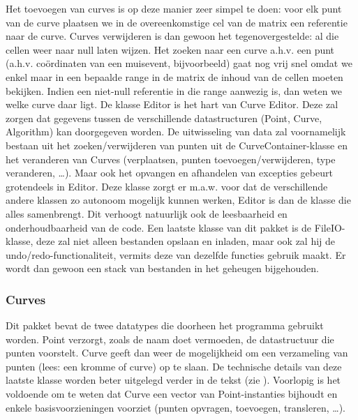 \documentclass[a4paper,11pt,oneside, titlepage]{article}
\begin{document}
Het toevoegen van curves is op deze manier zeer simpel te doen: voor elk punt van de curve plaatsen we in de overeenkomstige cel van de matrix een referentie naar de curve.
Curves verwijderen is dan gewoon het tegenovergestelde: al die cellen weer naar null laten wijzen. Het zoeken naar een curve a.h.v. een punt (a.h.v. co\"ordinaten van een muisevent, bijvoorbeeld) 
gaat nog vrij snel omdat we enkel maar in een bepaalde range in de matrix de inhoud van de cellen moeten bekijken. Indien een niet-null referentie in die range aanwezig is, dan weten we welke curve
daar ligt.\newline \newline
De klasse Editor is het hart van Curve Editor. Deze zal zorgen dat gegevens tussen de verschillende datastructuren (Point, Curve, Algorithm) kan doorgegeven worden.
De uitwisseling van data zal voornamelijk bestaan uit het zoeken/verwijderen van punten uit de CurveContainer-klasse en het veranderen van Curves (verplaatsen, punten toevoegen/verwijderen, type veranderen, \ldots).
Maar ook het opvangen en afhandelen van excepties gebeurt grotendeels in Editor. Deze klasse zorgt er m.a.w. voor dat de 
verschillende andere klassen zo autonoom mogelijk kunnen werken, Editor is dan de klasse die alles samenbrengt. Dit verhoogt natuurlijk ook de leesbaarheid en onderhoudbaarheid van de code.\newline \newline
Een laatste klasse van dit pakket is de FileIO-klasse, deze zal niet alleen bestanden opslaan en
inladen, maar ook zal hij de undo/redo-functionaliteit, vermits deze van
dezelfde functies gebruik maakt. Er wordt dan gewoon een stack van bestanden in het geheugen bijgehouden.
\subsubsection{Curves}
Dit pakket bevat de twee datatypes die doorheen het programma gebruikt worden. Point verzorgt, zoals
de naam doet vermoeden, de datastructuur die punten voorstelt. Curve geeft dan weer de
mogelijkheid om een verzameling van punten (lees: een kromme of curve) op te slaan. De
technische details van deze laatste klasse worden beter uitgelegd verder in de tekst (zie ). 
Voorlopig is het voldoende om te weten dat Curve een vector van Point-instanties bijhoudt en enkele
basisvoorzieningen voorziet (punten opvragen, toevoegen, transleren, \ldots).
\end{document}
